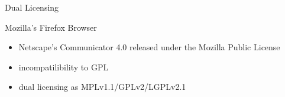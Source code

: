 \begin{frame}{\insertsubsection}
\begin{fancycolumns}
\begin{definition}{Dual Licensing}
\end{definition}
\hfill{}
\begin{example}{Mozilla's Firefox Browser} %
	\begin{itemize}
		\item Netscape's Communicator 4.0 released under the Mozilla Public License
		\item incompatilibility to GPL
		\item dual licensing as MPLv1.1/GPLv2/LGPLv2.1
	\end{itemize}
\end{example}
\end{fancycolumns}
\end{frame}
